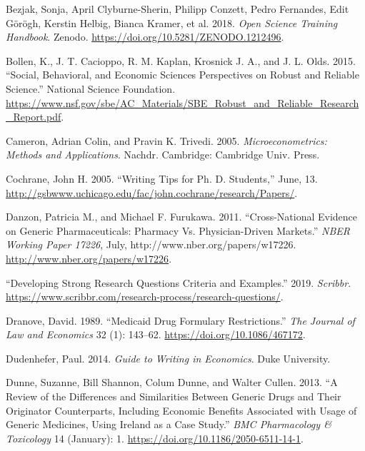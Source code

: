 \documentclass[
]{book}
\begin{document}
\leavevmode\hypertarget{ref-bezjak_open_2018}{}%
Bezjak, Sonja, April Clyburne-Sherin, Philipp Conzett, Pedro Fernandes,
Edit Görögh, Kerstin Helbig, Bianca Kramer, et al. 2018. \emph{Open
Science Training Handbook}. Zenodo.
\url{https://doi.org/10.5281/ZENODO.1212496}.

\leavevmode\hypertarget{ref-bollen_social_2015}{}%
Bollen, K., J. T. Cacioppo, R. M. Kaplan, Krosnick J. A., and J. L.
Olds. 2015. ``Social, Behavioral, and Economic Sciences Perspectives on
Robust and Reliable Science.'' National Science Foundation.
\url{https://www.nsf.gov/sbe/AC_Materials/SBE_Robust_and_Reliable_Research_Report.pdf}.

\leavevmode\hypertarget{ref-cameron_microeconometrics_2005}{}%
Cameron, Adrian Colin, and Pravin K. Trivedi. 2005.
\emph{Microeconometrics: Methods and Applications}. Nachdr. Cambridge:
Cambridge Univ. Press.

\leavevmode\hypertarget{ref-cochrane_writing_2005}{}%
Cochrane, John H. 2005. ``Writing Tips for Ph. D. Students,'' June, 13.
\url{http://gsbwww.uchicago.edu/fac/john.cochrane/research/Papers/}.

\leavevmode\hypertarget{ref-danzon_cross-national_2011}{}%
Danzon, Patricia M., and Michael F. Furukawa. 2011. ``Cross-National
Evidence on Generic Pharmaceuticals: Pharmacy Vs. Physician-Driven
Markets.'' \emph{NBER Working Paper 17226}, July,
http://www.nber.org/papers/w17226.
\url{http://www.nber.org/papers/w17226}.

\leavevmode\hypertarget{ref-noauthor_developing_2019}{}%
``Developing Strong Research Questions Criteria and Examples.'' 2019.
\emph{Scribbr}.
\url{https://www.scribbr.com/research-process/research-questions/}.

\leavevmode\hypertarget{ref-dranove_medicaid_1989}{}%
Dranove, David. 1989. ``Medicaid Drug Formulary Restrictions.''
\emph{The Journal of Law and Economics} 32 (1): 143--62.
\url{https://doi.org/10.1086/467172}.

\leavevmode\hypertarget{ref-dudenhefer_guide_2014}{}%
Dudenhefer, Paul. 2014. \emph{Guide to Writing in Economics}. Duke
University.

\leavevmode\hypertarget{ref-dunne_review_2013}{}%
Dunne, Suzanne, Bill Shannon, Colum Dunne, and Walter Cullen. 2013. ``A
Review of the Differences and Similarities Between Generic Drugs and
Their Originator Counterparts, Including Economic Benefits Associated
with Usage of Generic Medicines, Using Ireland as a Case Study.''
\emph{BMC Pharmacology \& Toxicology} 14 (January): 1.
\url{https://doi.org/10.1186/2050-6511-14-1}.
\end{document}
